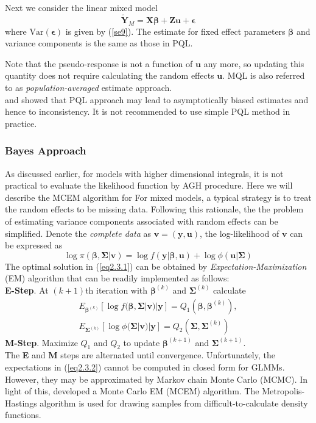 	Next we consider the linear mixed model 
	\[ \tilde{\bm Y}_M  = \bm {X\beta}+ \bm {Zu}  + \bm \epsilon\] 
	where $\text{Var}(\bm \epsilon) $ is given by (\ref{se9}).  The estimate for fixed effect parameters $\bm \beta$ and variance components is the same as those in PQL. 
	
	Note that the pseudo-response is not a function of $\bm u$ any more, so updating this quantity does not require calculating the random effects $\bm u$. MQL is also referred to as \textit{population-averaged} estimate approach. \\
	
	\cite{pinheiro2006efficient} and \cite{breslow1995bias} showed that PQL approach may lead to asymptotically biased estimates and hence to inconsistency. It is not recommended to use simple PQL method in practice. 


	\subsubsection{Bayes Approach}
	As discussed earlier, for models with higher dimensional integrals, it is not practical to evaluate the likelihood function by AGH procedure. 
	Here we will describe the MCEM algorithm for 
	For mixed models, a typical strategy is to treat the random effects to be missing data. Following this rationale, the the problem of estimating variance components associated with random effects can be simplified. Denote the \textit{complete data} as $\bm v = (\bm y, \bm u)$, the log-likelihood of $\bm v$ can be expressed as 
	\begin{equation}\label{eq2.3.1}
		\log \pi(\bm \beta , \bm \Sigma|\bm v) = \log f(\bm y|\bm \beta, \bm u) + \log \phi(\bm u|\bm \Sigma)
	\end{equation}  
	The optimal solution in (\ref{eq2.3.1}) can be obtained by \textit{Expectation-Maximization} (EM) algorithm that can be readily implemented as follows:\\
	\textbf{E-Step}. At $(k+1)$th iteration with $\bm \beta^{(k)}$ and $\bm\Sigma^{(k)}$   calculate 
	\begin{equation}\label{eq2.3.2}
	\begin{aligned}
		E_{\bm \beta^{(k)}}[\log f(\bm \beta , \bm \Sigma|\bm v)|\bm y]= Q_1(\bm \beta, \bm \beta^{(k)}), \\
		E_{\bm \Sigma^{(k)}}[\log \phi(\bm \Sigma|\bm v)|\bm y]= Q_2(\bm \Sigma, \bm \Sigma^{(k)})
	\end{aligned}
	\end{equation}
	\textbf{M-Step}.  Maximize $Q_1$ and $Q_2$ to update  $\bm \beta^{(k+1)}$ and $\bm\Sigma^{(k+1)}$. \\
	The \textbf{E} and \textbf{M} steps are alternated until convergence. Unfortunately, the expectations in (\ref{eq2.3.2}) cannot be computed in closed form for GLMMs. However, they may be approximated by Markov chain Monte Carlo (MCMC). In light of this, \cite{mcculloch1997maximum} developed a Monte Carlo EM (MCEM) algorithm. The Metropolis-Hastings algorithm is used for drawing samples from difficult-to-calculate density functions. \\

